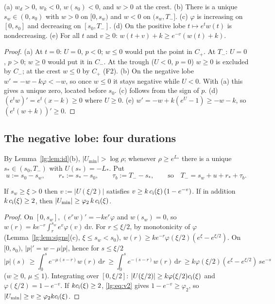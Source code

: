 \begin{lemma}\label{lg:lem:signs}
\textup{(a)} $w_d>0$, $w_k<0$, $w(s_0)<0$, and $w>0$ at the crest.
\textup{(b)} There is a unique $s_w\in(0,s_0)$ with $w>0$ on $[0,s_w)$ and $w<0$ on $(s_w,T_-]$.
\textup{(c)} $\varphi$ is increasing on $[0,s_0]$ and decreasing on $[s_0,T_-]$.
\textup{(d)} On the positive lobe $t\mapsto e^tw(t)$ is nondecreasing.
\textup{(e)} For all $t$ and $v\ge0$: $w(t+v)+k\ge e^{-v}(w(t)+k)$.
\end{lemma}
\begin{proof}
(a) At $t=0$: $U=0$, $p<0$; $w\le0$ would put the point in $C_+$. At $T_-$: $U=0$, $p>0$; $w\ge0$
would put it in $C_-$. At the trough ($U<0$, $p=0$) $w\ge0$ is excluded by $C_-$; at the crest
$w\le0$ by $C_+$ (F2).
(b) On the negative lobe $w'=-w-k\varphi<-w$, so once $w\le0$ it stays negative while $U<0$. With (a)
this gives a unique zero, located before $s_0$. (c) follows from the sign of $p$.
(d) $(e^tw)'=e^t(x-k)\ge0$ where $U\ge0$. (e) $w'=-w+k(e^U-1)\ge-w-k$, so $(e^t(w+k))'\ge0$.
\end{proof}

\subsection{The negative lobe: four durations}\label{lg:sec:negativelobe}
By Lemma~\ref{lg:lem:id}(b), $|U_{\min}|>\log\rho$; whenever $\rho\ge e^{L_\ast}$ there is a unique
$s_\ast\in(s_0,T_-)$ with $U(s_\ast)=-L_\ast$. Put
\[
u:=s_0-s_w,\qquad r_\ast:=s_\ast-s_0,\qquad \tau_b:=T_--s_\ast,\qquad\text{so}\quad
T_-=s_w+u+r_\ast+\tau_b .
\]
\begin{lemma}[Phase (i): $w>0$]\label{lg:lem:i}
If $s_w\ge \xi>0$ then $v:=|U(\xi/2)|$ satisfies $v\ge k\,c_{\rm i}(\xi)\,(1-e^{-v})$. If in addition
$k\,c_{\rm i}(\xi)\ge2$, then $|U_{\min}|\ge\varphi_2\,k\,c_{\rm i}(\xi)$.
\end{lemma}
\begin{proof}
On $[0,s_w]$, $(e^rw)'=-ke^r\varphi$ and $w(s_w)=0$, so $w(r)=ke^{-r}\int_r^{s_w}e^v\varphi(v)\,\mathrm dv$.
For $r\le \xi/2$, by monotonicity of $\varphi$ (Lemma~\ref{lg:lem:signs}(c), $\xi\le s_w<s_0$),
$w(r)\ge ke^{-r}\varphi(\xi/2)(e^\xi-e^{\xi/2})$. On $[0,s_0)$, $|p|'=w-\mu|p|$, hence for $s\le \xi/2$
\[
|p|(s)\ \ge\int_0^se^{-\mu(s-r)}w(r)\,\mathrm dr\ \ge\int_0^se^{-(s-r)}w(r)\,\mathrm dr
\ \ge k\varphi(\xi/2)(e^\xi-e^{\xi/2})\,se^{-s}
\]
($w\ge0$, $\mu\le1$). Integrating over $[0,\xi/2]$: $|U(\xi/2)|\ge k\varphi(\xi/2)c_{\rm i}(\xi)$ and
$\varphi(\xi/2)=1-e^{-v}$. If $kc_{\rm i}(\xi)\ge2$, \eqref{lg:eq:v2} gives $1-e^{-v}\ge\varphi_2$, so
$|U_{\min}|\ge v\ge\varphi_2kc_{\rm i}(\xi)$.
\end{proof}

